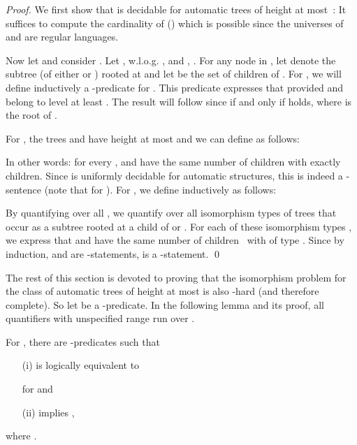 \documentclass[envcountsame]{llncs}
\begin{document}
\begin{proof}
  We first show that  is decidable for automatic trees
   of height at most~: It suffices to compute
  the cardinality of  () which is possible since
  the universes of  and  are regular languages.

  Now let  and consider .
  Let , w.l.o.g. , and , .  For any node  in , let
   denote the subtree (of either  or ) rooted at 
  and let  be the set of children of .  For
  , we will define inductively a
  -predicate  for . This predicate expresses that  provided
   and  belong to level at least .  The result will follow since
   if and only if  holds, where  is
  the root of .

  For , the trees  and  have height at most 
  and we can define  as follows:
  
  In other words: for every , 
  and  have the same number of children with exactly 
  children. Since  is uniformly decidable for
  automatic structures, this is indeed a -sentence (note that
   for ). For , we define
   inductively as follows:
  
  By quantifying over all , we quantify over
  all isomorphism types of trees that occur as a subtree rooted at a
  child of  or . For each of these isomorphism types ,
  we express that  and  have the same number of children~
  with  of type .  Since by induction,
   and  are
  -statements,  is a
  -statement.  \qed
\end{proof}
The rest of this section is devoted to proving that the isomorphism
problem for the class  of automatic trees of height at most
 is also -hard (and therefore complete). So let
 be a -predicate.
In the following lemma and its proof, all quantifiers with 
unspecified range run over .
\begin{lemma}\label{lem:normalform}
  For , there are -predicates
   such that
  \begin{enumerate}
  \item[(i)]  is logically equivalent to
    
    for  and
  \item[(ii)] 
    implies ,
  \end{enumerate}
  where .
\end{lemma}
\end{document}
